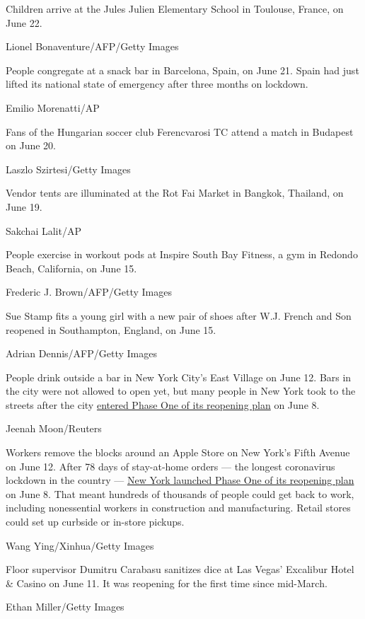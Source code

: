 Children arrive at the Jules Julien Elementary School in Toulouse,
France, on June 22.

Lionel Bonaventure/AFP/Getty Images

People congregate at a snack bar in Barcelona, Spain, on June 21. Spain
had just lifted its national state of emergency after three months on
lockdown.

Emilio Morenatti/AP

Fans of the Hungarian soccer club Ferencvarosi TC attend a match in
Budapest on June 20.

Laszlo Szirtesi/Getty Images

Vendor tents are illuminated at the Rot Fai Market in Bangkok, Thailand,
on June 19.

Sakchai Lalit/AP

People exercise in workout pods at Inspire South Bay Fitness, a gym in
Redondo Beach, California, on June 15.

Frederic J. Brown/AFP/Getty Images

Sue Stamp fits a young girl with a new pair of shoes after W.J. French
and Son reopened in Southampton, England, on June 15.

Adrian Dennis/AFP/Getty Images

People drink outside a bar in New York City's East Village on June 12.
Bars in the city were not allowed to open yet, but many people in New
York took to the streets after the city
\href{https://www.cnn.com/interactive/2020/06/us/new-york-coronavirus-reopening-cnnphotos/index.html}{entered
Phase One of its reopening plan} on June 8.

Jeenah Moon/Reuters

Workers remove the blocks around an Apple Store on New York's Fifth
Avenue on June 12. After 78 days of stay-at-home orders --- the longest
coronavirus lockdown in the country ---
\href{https://www.cnn.com/interactive/2020/06/us/new-york-coronavirus-reopening-cnnphotos/index.html}{New
York launched Phase One of its reopening plan} on June 8. That meant
hundreds of thousands of people could get back to work, including
nonessential workers in construction and manufacturing. Retail stores
could set up curbside or in-store pickups.

Wang Ying/Xinhua/Getty Images

Floor supervisor Dumitru Carabasu sanitizes dice at Las Vegas' Excalibur
Hotel \& Casino on June 11. It was reopening for the first time since
mid-March.

Ethan Miller/Getty Images

